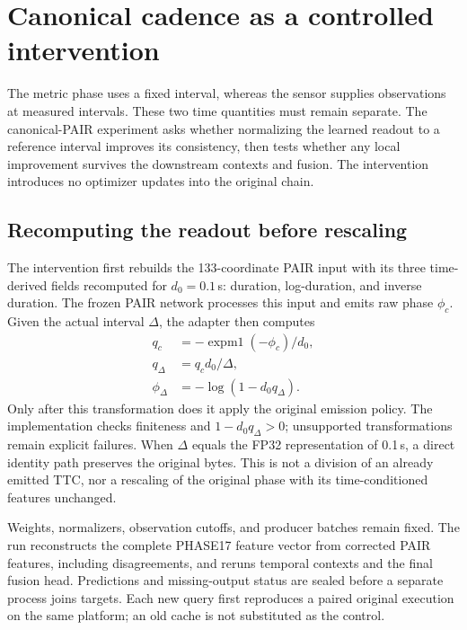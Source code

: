 \section{Canonical cadence as a controlled intervention}
\label{sec:canonical-cadence}

The metric phase uses a fixed interval, whereas the sensor supplies observations at measured intervals. These two time quantities must remain separate. The canonical-PAIR experiment asks whether normalizing the learned readout to a reference interval improves its consistency, then tests whether any local improvement survives the downstream contexts and fusion. The intervention introduces no optimizer updates into the original chain. 

\subsection{Recomputing the readout before rescaling}
The intervention first rebuilds the 133-coordinate PAIR input with its three time-derived fields recomputed for $d_0=0.1$\,s: duration, log-duration, and inverse duration. The frozen PAIR network processes this input and emits raw phase $\phi_c$. Given the actual interval $\Delta$, the adapter then computes
\begin{align}
 q_c&=-\operatorname{expm1}(-\phi_c)/d_0,\\
 q_\Delta&=q_c d_0/\Delta,\\
 \phi_\Delta&=-\log(1-d_0q_\Delta).
 \label{eq:canonical-pair-intervention}
\end{align}
Only after this transformation does it apply the original emission policy. The implementation checks finiteness and $1-d_0q_\Delta>0$; unsupported transformations remain explicit failures. When $\Delta$ equals the FP32 representation of 0.1\,s, a direct identity path preserves the original bytes. This is not a division of an already emitted TTC, nor a rescaling of the original phase with its time-conditioned features unchanged. 

Weights, normalizers, observation cutoffs, and producer batches remain fixed. The run reconstructs the complete PHASE17 feature vector from corrected PAIR features, including disagreements, and reruns temporal contexts and the final fusion head. Predictions and missing-output status are sealed before a separate process joins targets. Each new query first reproduces a paired original execution on the same platform; an old cache is not substituted as the control.

